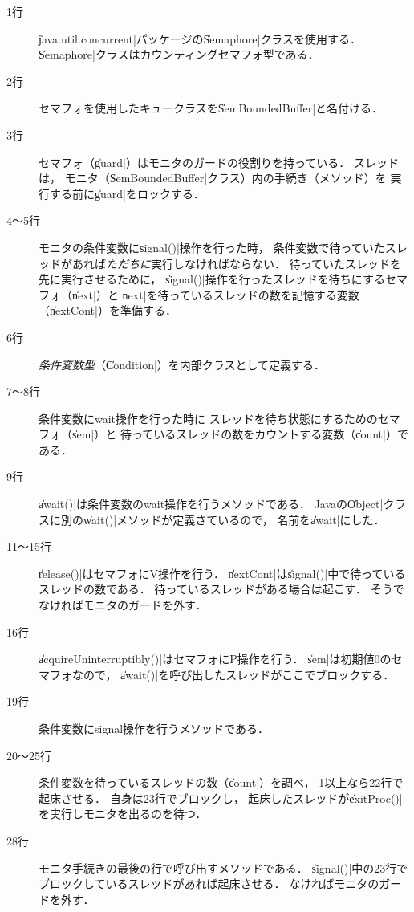 \begin{description}
\item [1行]
  \|java.util.concurrent|パッケージの\|Semaphore|クラスを使用する．
  \|Semaphore|クラスはカウンティングセマフォ型である．
\item [2行]
  セマフォを使用したキュークラスを\|SemBoundedBuffer|と名付ける．
\item [3行]
  セマフォ（\|guard|）はモニタのガードの役割りを持っている．
  スレッドは，
  モニタ（\|SemBoundedBuffer|クラス）内の手続き（メソッド）を
  実行する前に\|guard|をロックする．
\item [4〜5行]
  モニタの条件変数に\|signal()|操作を行った時，
  条件変数で待っていたスレッドがあれば\emph{ただちに}実行しなければならない．
  待っていたスレッドを先に実行させるために，
  \|signal()|操作を行ったスレッドを待ちにするセマフォ（\|next|）と
  \|next|を待っているスレッドの数を記憶する変数（\|nextCont|）を準備する．
\item [6行]
  \emph{条件変数型}（\|Condition|）を内部クラスとして定義する．
\item [7〜8行]
  条件変数にwait操作を行った時に
  スレッドを待ち状態にするためのセマフォ（\|sem|）と
  待っているスレッドの数をカウントする変数（\|count|）である．
\item [9行]
  \|await()|は条件変数のwait操作を行うメソッドである．
  Javaの\|Object|クラスに別の\|wait()|メソッドが定義さているので，
  名前を\|await|にした．
\item [11〜15行]
  \|release()|はセマフォにV操作を行う．
  \|nextCont|は\|signal()|中で待っているスレッドの数である．
  待っているスレッドがある場合は起こす．
  そうでなければモニタのガードを外す．
\item [16行]
  \|acquireUninterruptibly()|はセマフォにP操作を行う．
  \|sem|は初期値0のセマフォなので，
  \|await()|を呼び出したスレッドがここでブロックする．
\item [19行]
  条件変数にsignal操作を行うメソッドである．
\item [20〜25行]
  条件変数を待っているスレッドの数（\|count|）を調べ，
  1以上なら22行で起床させる．
  自身は23行でブロックし，
  起床したスレッドが\|exitProc()|を実行しモニタを出るのを待つ．
\item [28行]
  モニタ手続きの最後の行で呼び出すメソッドである．
  \|signal()|中の23行でブロックしているスレッドがあれば起床させる．
  なければモニタのガードを外す．
\end{description}

